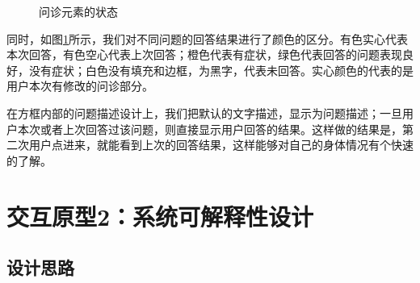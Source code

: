 \begin{figure}[h]
    \centering
    \caption{问诊元素的状态}
    \label{fig:question_status}
\end{figure}

同时，如图\ref{fig:question_status}所示，我们对不同问题的回答结果进行了颜色的区分。有色实心代表本次回答，有色空心代表上次回答；橙色代表有症状，绿色代表回答的问题表现良好，没有症状；白色没有填充和边框，为黑字，代表未回答。实心颜色的代表的是用户本次有修改的问诊部分。

在方框内部的问题描述设计上，我们把默认的文字描述，显示为问题描述；一旦用户本次或者上次回答过该问题，则直接显示用户回答的结果。这样做的结果是，第二次用户点进来，就能看到上次的回答结果，这样能够对自己的身体情况有个快速的了解。

\section{交互原型2：系统可解释性设计}

\subsection{设计思路}

